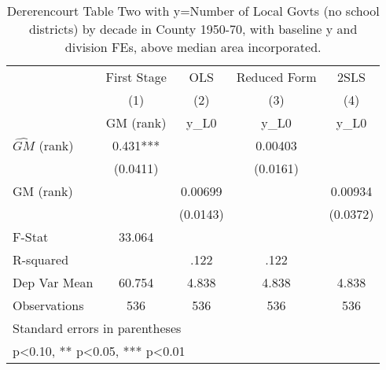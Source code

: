 \begin{table}[htbp]\centering
\def\sym#1{\ifmmode^{#1}\else\(^{#1}\)\fi}
\caption{Dererencourt Table Two with y=Number of Local Govts (no school districts) by decade in County 1950-70, with baseline y and division FEs, above median area incorporated.}
\begin{tabular}{l*{4}{c}}
\toprule
                    & First Stage   &         OLS   &Reduced Form   &        2SLS   \\
                    &\multicolumn{1}{c}{(1)}&\multicolumn{1}{c}{(2)}&\multicolumn{1}{c}{(3)}&\multicolumn{1}{c}{(4)}\\
                    &\multicolumn{1}{c}{GM  (rank)}&\multicolumn{1}{c}{y\_L0}&\multicolumn{1}{c}{y\_L0}&\multicolumn{1}{c}{y\_L0}\\
\midrule
$\hat{GM}$ (rank)   &       0.431***&               &     0.00403   &               \\
                    &    (0.0411)   &               &    (0.0161)   &               \\
\addlinespace
GM  (rank)          &               &     0.00699   &               &     0.00934   \\
                    &               &    (0.0143)   &               &    (0.0372)   \\
\midrule
F-Stat              &      33.064   &               &               &               \\
R-squared           &               &        .122   &        .122   &               \\
Dep Var Mean        &      60.754   &       4.838   &       4.838   &       4.838   \\
Observations        &         536   &         536   &         536   &         536   \\
\bottomrule
\multicolumn{5}{l}{\footnotesize Standard errors in parentheses}\\
\multicolumn{5}{l}{\footnotesize * p<0.10, ** p<0.05, *** p<0.01}\\
\end{tabular}
\end{table}
